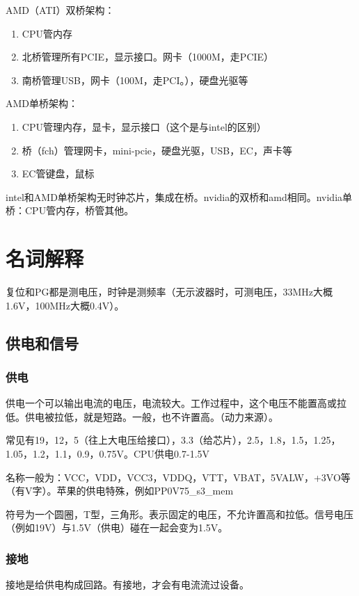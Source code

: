 AMD（ATI）双桥架构：
\begin{enumerate}
    \item CPU管内存
    \item 北桥管理所有PCIE，显示接口。网卡（1000M，走PCIE）
    \item 南桥管理USB，网卡（100M，走PCI。），硬盘光驱等
\end{enumerate}

AMD单桥架构：
\begin{enumerate}
    \item CPU管理内存，显卡，显示接口（这个是与intel的区别）
    \item 桥（fch）管理网卡，mini-pcie，硬盘光驱，USB，EC，声卡等
    \item EC管键盘，鼠标
\end{enumerate}

intel和AMD单桥架构无时钟芯片，集成在桥。nvidia的双桥和amd相同。nvidia单桥：CPU管内存，桥管其他。

\section{名词解释}
\begin{intro}
    复位和PG都是测电压，时钟是测频率（无示波器时，可测电压，33MHz大概1.6V，100MHz大概0.4V）。
\end{intro}
\subsection{供电和信号}
\subsubsection{供电}
供电一个可以输出电流的电压，电流较大。工作过程中，这个电压不能置高或拉低。供电被拉低，就是短路。一般，也不许置高。（动力来源）。

常见有19，12，5（往上大电压给接口），3.3（给芯片），2.5，1.8，1.5，1.25，1.05，1.2，1.1，0.9，0.75V。CPU供电0.7-1.5V

名称一般为：VCC，VDD，VCC3，VDDQ，VTT，VBAT，5VALW，+3VO等（有V字）。苹果的供电特殊，例如PP0V75\_s3\_mem

符号为一个圆圈，T型，三角形。表示固定的电压，不允许置高和拉低。信号电压（例如19V）与1.5V（供电）碰在一起会变为1.5V。

\subsubsection{接地}
接地是给供电构成回路。有接地，才会有电流流过设备。

